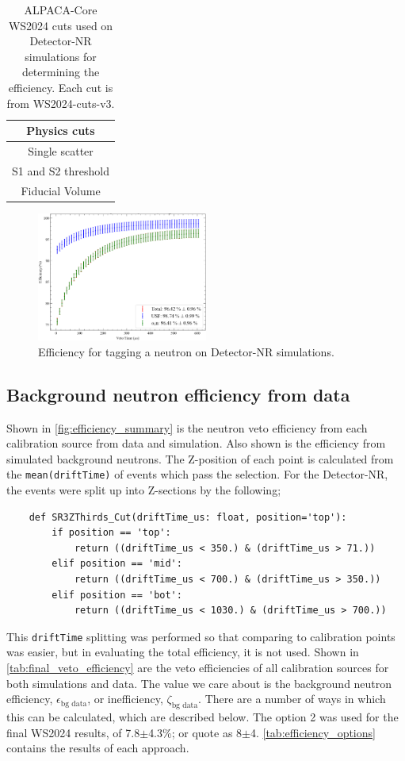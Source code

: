 \begin{table}
	\centering
	\begin{tabular}{c}
		Physics cuts        \\
		\hline
		Single scatter      \\
		S1 and S2 threshold \\
		Fiducial Volume
	\end{tabular}
	\caption{ALPACA-Core WS2024 cuts used on Detector-NR simulations for determining the efficiency. Each cut is from WS2024-cuts-v3.}
	\label{tab:detector_nr_simulation_efficiency_cuts}
\end{table}

\begin{figure}
	\centering
	\includegraphics[width=0.5\textwidth]{figures/VetoEfficiency/det_nr_efficiency.png}
	\caption{Efficiency for tagging a neutron on Detector-NR simulations.}
	\label{fig:detector_nr_efficiency}
\end{figure}

\clearpage
\subsection{Background neutron efficiency from data}
Shown in \autoref{fig:efficiency_summary} is the neutron veto efficiency from each calibration source from data and simulation.
Also shown is the efficiency from simulated background neutrons.
The Z-position of each point is calculated from the \lstinline{mean(driftTime)} of events which pass the selection.
For the Detector-NR, the events were split up into Z-sections by the following;
\begin{lstlisting}
    def SR3ZThirds_Cut(driftTime_us: float, position='top'):
        if position == 'top':
            return ((driftTime_us < 350.) & (driftTime_us > 71.))
        elif position == 'mid':
            return ((driftTime_us < 700.) & (driftTime_us > 350.))
        elif position == 'bot':
            return ((driftTime_us < 1030.) & (driftTime_us > 700.))
\end{lstlisting}
This \lstinline{driftTime} splitting was performed so that comparing to calibration points was easier, but in evaluating the total efficiency, it is not used.
Shown in \autoref{tab:final_veto_efficiency} are the veto efficiencies of all calibration sources for both simulations and data.
The value we care about is the background neutron efficiency, $\epsilon_{\textrm{bg data}}$, or inefficiency, $\zeta_{\textrm{bg data}}$.
There are a number of ways in which this can be calculated, which are described below.
The option 2 was used for the final WS2024 results, of 7.8$\pm$4.3\%; or quote as 8$\pm$4.
\autoref{tab:efficiency_options} contains the results of each approach.
